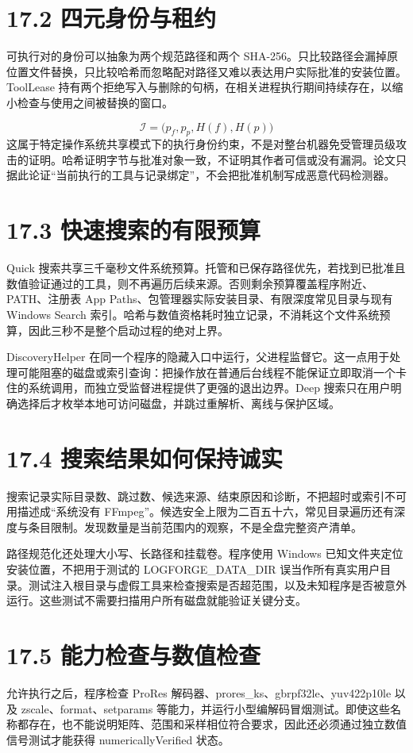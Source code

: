 \documentclass[UTF8,zihao=-4,openany]{ctexbook}
\begin{document}
\section*{17.2 四元身份与租约}
可执行对的身份可以抽象为两个规范路径和两个 SHA-256。只比较路径会漏掉原位置文件替换，只比较哈希而忽略配对路径又难以表达用户实际批准的安装位置。ToolLease 持有两个拒绝写入与删除的句柄，在相关进程执行期间持续存在，以缩小检查与使用之间被替换的窗口。


\begin{equation}
\mathcal{I}=\bigl(p_f,p_p,H(f),H(p)\bigr)
\end{equation}
这属于特定操作系统共享模式下的执行身份约束，不是对整台机器免受管理员级攻击的证明。哈希证明字节与批准对象一致，不证明其作者可信或没有漏洞。论文只据此论证“当前执行的工具与记录绑定”，不会把批准机制写成恶意代码检测器。


\section*{17.3 快速搜索的有限预算}
Quick 搜索共享三千毫秒文件系统预算。托管和已保存路径优先，若找到已批准且数值验证通过的工具，则不再遍历后续来源。否则剩余预算覆盖程序附近、PATH、注册表 App Paths、包管理器实际安装目录、有限深度常见目录与现有 Windows Search 索引。哈希与数值资格耗时独立记录，不消耗这个文件系统预算，因此三秒不是整个启动过程的绝对上界。

DiscoveryHelper 在同一个程序的隐藏入口中运行，父进程监督它。这一点用于处理可能阻塞的磁盘或索引查询：把操作放在普通后台线程不能保证立即取消一个卡住的系统调用，而独立受监督进程提供了更强的退出边界。Deep 搜索只在用户明确选择后才枚举本地可访问磁盘，并跳过重解析、离线与保护区域。


\section*{17.4 搜索结果如何保持诚实}
搜索记录实际目录数、跳过数、候选来源、结束原因和诊断，不把超时或索引不可用描述成“系统没有 FFmpeg”。候选安全上限为二百五十六，常见目录遍历还有深度与条目限制。发现数量是当前范围内的观察，不是全盘完整资产清单。

路径规范化还处理大小写、长路径和挂载卷。程序使用 Windows 已知文件夹定位安装位置，不把用于测试的 LOGFORGE\_DATA\_DIR 误当作所有真实用户目录。测试注入根目录与虚假工具来检查搜索是否超范围，以及未知程序是否被意外运行。这些测试不需要扫描用户所有磁盘就能验证关键分支。


\section*{17.5 能力检查与数值检查}
允许执行之后，程序检查 ProRes 解码器、prores\_ks、gbrpf32le、yuv422p10le 以及 zscale、format、setparams 等能力，并运行小型编解码冒烟测试。即使这些名称都存在，也不能说明矩阵、范围和采样相位符合要求，因此还必须通过独立数值信号测试才能获得 numericallyVerified 状态。
\end{document}
